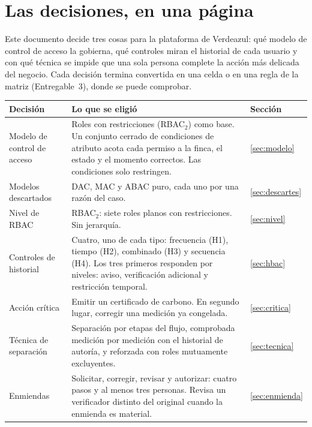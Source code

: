 \documentclass[11pt,letterpaper]{article}
\newcommand{\cab}[1]{\textbf{\rmfamily #1}}
\begin{document}
\tableofcontents
\newpage
{}

\section{Las decisiones, en una página}

Este documento decide tres cosas para la plataforma de Verdeazul: qué modelo de control de acceso la
gobierna, qué controles miran el historial de cada usuario y con qué técnica se impide que una sola
persona complete la acción más delicada del negocio. Cada decisión termina convertida en una celda o
en una regla de la matriz (Entregable~3), donde se puede comprobar.

\begin{center}
\small
\renewcommand{\arraystretch}{1.18}
\begin{tabularx}{\textwidth}{@{}L{3.5cm} Y L{1.1cm}@{}}
\toprule
\cab{Decisión} & \cab{Lo que se eligió} & \cab{Sección} \\
\midrule
Modelo de control de acceso &
Roles con restricciones (RBAC$_2$) como base. Un conjunto cerrado de condiciones de atributo acota
cada permiso a la finca, el estado y el momento correctos. Las condiciones solo restringen. & \ref{sec:modelo} \\
Modelos descartados &
DAC, MAC y ABAC puro, cada uno por una razón del caso. & \ref{sec:descartes} \\
Nivel de RBAC &
RBAC$_2$: siete roles planos con restricciones. Sin jerarquía. & \ref{sec:nivel} \\
Controles de historial &
Cuatro, uno de cada tipo: frecuencia (H1), tiempo (H2), combinado (H3) y secuencia (H4). Los tres
primeros responden por niveles: aviso, verificación adicional y restricción temporal. & \ref{sec:hbac} \\
Acción crítica &
Emitir un certificado de carbono. En segundo lugar, corregir una medición ya congelada. & \ref{sec:critica} \\
Técnica de separación &
Separación por etapas del flujo, comprobada medición por medición con el historial de autoría, y
reforzada con roles mutuamente excluyentes. & \ref{sec:tecnica} \\
Enmiendas &
Solicitar, corregir, revisar y autorizar: cuatro pasos y al menos tres personas. Revisa un
verificador distinto del original cuando la enmienda es material. & \ref{sec:enmienda} \\
\bottomrule
\end{tabularx}
\end{center}
\end{document}
